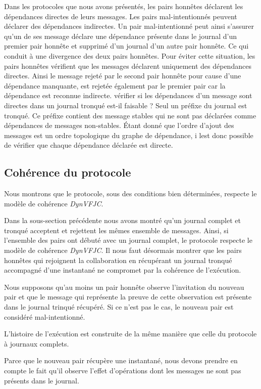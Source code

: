 Dans les protocoles que nous avons présentés, les pairs honnêtes déclarent les dépendances directes de leurs messages.
Les pairs mal-intentionnés peuvent déclarer des dépendances indirectes.
Un pair mal-intentionné peut ainsi s'assurer qu'un de ses message déclare une dépendance présente dans le journal d'un premier pair honnête et supprimé d'un journal d'un autre pair honnête.
Ce qui conduit à une divergence des deux pairs honnêtes.
Pour éviter cette situation, les pairs honnêtes vérifient que les messages déclarent uniquement des dépendances directes.
Ainsi le message rejeté par le second pair honnête pour cause d'une dépendance manquante, est rejetée également par le premier pair car la dépendance est reconnue indirecte.
vérifier si les dépendances d'un message sont directes dans un journal tronqué est-il faisable ?
Seul un préfixe du journal est tronqué.
Ce préfixe contient des message stables qui ne sont pas déclarées comme dépendances de messages non-stables.
Étant donné que l'ordre d'ajout des messages est un ordre topologique du graphe de dépendance, i lest donc possible de vérifier que chaque dépendance déclarée est directe.

\subsection{Cohérence du protocole}

Nous montrons que le protocole, sous des conditions bien déterminées, respecte le modèle de cohérence \emph{DynVFJC}.

Dans la sous-section précédente nous avons montré qu'un journal complet et tronqué acceptent et rejettent les mêmes ensemble de messages.
Ainsi, si l'ensemble des pairs ont débuté avec un journal complet, le protocole respecte le modèle de cohérence \emph{DynVFJC}.
Il nous faut désormais montrer que les pairs honnêtes qui rejoignent la collaboration en récupérant un journal tronqué accompagné d'une instantané ne compromet par la cohérence de l'exécution.

Nous supposons qu'au moins un pair honnête observe l'invitation du nouveau pair et que le message qui représente la preuve de cette observation est présente dans le journal trinqué récupéré.
Si ce n'est pas le cas, le nouveau pair est considéré mal-intentionné.

L'histoire de l'exécution est construite de la même manière que celle du protocole à journaux complets.

Parce que le nouveau pair récupère une instantané, nous devons prendre en compte le fait qu'il observe l'effet d'opérations dont les messages ne sont pas présents dans le journal.


